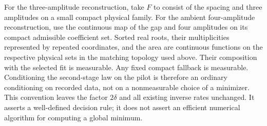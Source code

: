 For the three-amplitude reconstruction, take $F$ to consist of the spacing and three amplitudes on a small compact physical family. For the ambient four-amplitude reconstruction, use the continuous map of the gap and four amplitudes on its compact admissible coefficient set. Sorted real roots, their multiplicities represented by repeated coordinates, and the area are continuous functions on the respective physical sets in the matching topology used above. Their composition with the selected fit is measurable. Any fixed compact fallback is measurable. Conditioning the second-stage law on the pilot is therefore an ordinary conditioning on recorded data, not on a nonmeasurable choice of a minimizer. This convention leaves the factor $2\delta$ and all existing inverse rates unchanged. It asserts a well-defined decision rule; it does not assert an efficient numerical algorithm for computing a global minimum.
